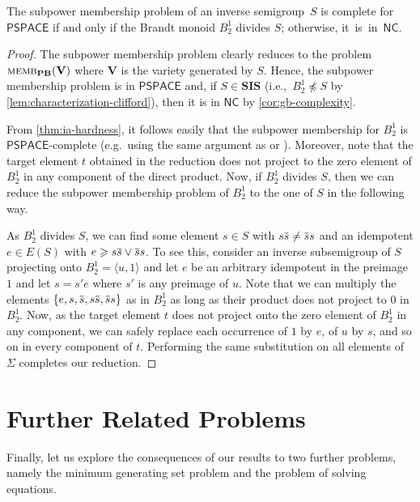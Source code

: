 \documentclass[anonymous,letter,UKenglish,cleveref,autoref,thm-restate]{lipics-v2021}
\renewcommand{\geq}{\geqslant}
\newcommand{\ie}{i.e.,~}
\newcommand{\eg}{e.g.~}
\newcommand{\gen}[1]{\langle #1 \rangle}
\newcommand{\NC}{\ensuremath{\mathsf{NC}}\xspace}
\newcommand{\PSPACE}{\ensuremath{\mathsf{PSPACE}}\xspace}
\newcommand{\vV}{\ensuremath{\mathbf{V}}}
\newcommand{\vSI}{\ensuremath{\mathbf{SIS}}}
\newcommand\nindent{.5pt}
\newcommand\noverline[1]{\kern\nindent\overline{\kern-\nindent#1\kern-\nindent}\kern\nindent}
\newcommand{\ov}[1]{\noverline{#1}}
\theoremstyle{plain}
\theoremstyle{plain}
\newcommand{\dMemb}[2][]{\textup{\textsc{memb${}_{\mathbf{#1}}\expandafter\ifx\expandafter\relax\detokenize{#2}\relax\else(#2)\fi$}}}
\begin{document}
\begin{corollary}
  The subpower membership problem of an inverse semigroup~$S$ is complete for \PSPACE if and only if the Brandt monoid $B_2^1$ divides $S$; otherwise, it~is~in~\NC.
\end{corollary}
\begin{proof}
	The subpower membership problem clearly reduces to the problem $\dMemb[PB]{\vV}$ where $\vV$ is the variety generated by $S$. 
  Hence, the subpower membership problem is in \PSPACE and, if $S \in \vSI$ (\ie $B^1_2 \not\preccurlyeq S$ by \cref{lem:characterization-clifford}), then it is in \NC by \cref{cor:gb-complexity}.
	
	From \cref{thm:ia-hardness}, it follows easily that the subpower membership for $B_2^1$ is \PSPACE-complete (\eg using the same argument as \cite[Theorem 3.2]{BirgetM08} or \cite[Theorem 4.10]{Jack23}).
	Moreover, note that the target element $t$ obtained in the reduction does not project to the zero element of $B_2^1$ in any component of the direct product.
	Now, if $B_2^1$ divides $S$, then we can reduce the subpower membership problem of $B_2^1$ to the one of $S$ in the following way.
	
	As $B_2^1$ divides $S$, we can find some element $s \in S$ with $s\ov s \neq \ov s s$ and an idempotent $e \in E(S)$ with $e \geq s\ov s \vee \ov s s$.
	To see this, consider an inverse subsemigroup of $S$ projecting onto $B_2^1 = \gen{u, 1}$ and let $e$ be an arbitrary idempotent in the preimage $1$ and let $s = s' e$ where $s'$ is any preimage of $u$.
	Note that we can multiply the elements $\{e,s,\ov s, s\ov s, \ov s s\}$ as in $B_2^1$ as long as their product does not project to $0$ in $B_2^1$.
	Now, as the target element $t$ does not project onto the zero element of $B_2^1$ in any component, we can safely replace each occurrence of $1$ by $e$, of $u$ by $s$, and so on in every component of $t$.
  Performing the same substitution on all elements of $\Sigma$ 
  completes our reduction.
\end{proof}


\section{Further Related Problems}\label{sec:applications}

Finally, let us explore the consequences of our results to two further problems, namely the minimum generating set problem and the problem of solving equations.
\end{document}
